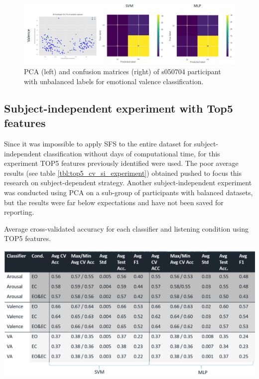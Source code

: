 \begin{figure}[!htb]
\includegraphics[width=16cm]{img/appendix/valence_unbalanced_pca_confusion.png}
\centering
\caption{PCA (left) and confusion matrices (right) of s050704 participant with unbalanced labels for emotional valence 
classification.}\label{fig:valence_unbalanced_pca_confusion}
\end{figure}
\FloatBarrier

\subsection{Subject-independent experiment with Top5 features}
\label{sec:appendix_A3.4}
Since it was impossible to apply \ac{SFS} to the entire dataset for subject-independent classification without days of computational time, for this experiment TOP5 features previously identified were used. The poor average results (see table \ref{tbl:top5_cv_si_experiment}) obtained pushed to focus this research on subject-dependent strategy. Another subject-independent experiment was conducted using \ac{PCA} on a sub-group of participants with balanced datasets, but the results were far below expectations and have not been saved for reporting.

\begin{table}[h!]
  \caption{ Average cross-validated accuracy for each classifier and listening condition using TOP5 features.}
  \label{tbl:top5_cv_si_experiment}
  \includegraphics[width=\linewidth]{img/appendix/top5_cv_si_experiment.png}
\end{table}
\FloatBarrier

